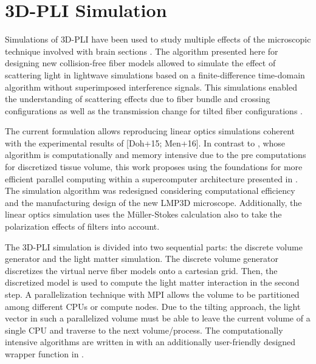 \cleardoublepage
\setcounter{chapter}{5}
\chapter{\acs{3D-PLI} Simulation}
\label{cha:sof:simulation}
%
Simulations of \ac{3D-PLI} have been used to study multiple effects of the microscopic technique involved with brain sections \cite{Dohmen2015,Menzel2015,Menzel2016,Menzel2020,Menzel2021,MenzelMaster,MenzelDissertation}.
The algorithm presented here for designing new collision-free fiber models allowed to simulate the effect of scattering light in  lightwave simulations based on a finite-difference time-domain algorithm without superimposed interference signals.
This simulations enabled the understanding of scattering effects due to fiber bundle and crossing configurations as well as the transmission change for tilted fiber configurations \cite{MenzelDissertation,Menzel2020,Menzel2021}.
\par
% 
The current formulation allows reproducing linear optics simulations coherent with the experimental results of [Doh+15; Men+16].
In contrast to \cite{Dohmen2015,Menzel2016}, whose algorithm is computationally and memory intensive due to the pre computations for discretized tissue volume, this work proposes using the foundations for more efficient parallel computing within a supercomputer architecture presented in \cite{Lucksch2016}.
The simulation algorithm was redesigned considering computational efficiency and the manufacturing design of the new \ac{LMP3D} microscope. 
Additionally, the linear optics simulation uses the M{\"u}ller-Stokes calculation also to take the polarization effects of filters into account.
\par
%
The \ac{3D-PLI} simulation is divided into two sequential parts: the discrete volume generator and the light matter simulation.
The discrete volume generator discretizes the virtual nerve fiber models onto a cartesian grid.
Then, the discretized model is used to compute the light matter interaction in the second step.
A parallelization technique with \ac{MPI} allows the volume to be partitioned among different \acp{CPU} or compute nodes.
Due to the tilting approach, the light vector in such a parallelized volume must be able to leave the current volume of a single \ac{CPU} and traverse to the next volume/process.
The computationally intensive algorithms are written in \cpp{} with an additionally user-friendly designed wrapper function in \python{}.
%
% 
% 
